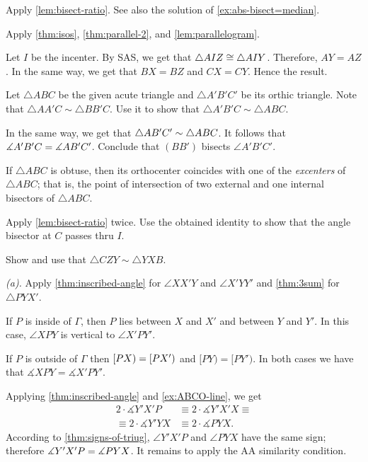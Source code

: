 Apply \ref{lem:bisect-ratio}.
See also the solution of \ref{ex:abs-bisect=median}.

Apply \ref{thm:isos}, \ref{thm:parallel-2}, and \ref{lem:parallelogram}.

Let $I$ be the incenter.
By SAS, we get that $\triangle AIZ\cong\triangle AIY$.
Therefore, $AY=AZ$.
In the same way, we get that $BX=BZ$ and $CX=CY$.
Hence the result.

Let $\triangle ABC$ be the given acute triangle and $\triangle A'B'C'$ 
be its orthic triangle.
Note that $\triangle AA'C\sim\triangle BB'C$.
Use it to show that $\triangle A'B'C\sim \triangle ABC$.

In the same way, we get that $\triangle AB'C'\sim \triangle ABC$.
It follows that $\measuredangle A'B'C=\measuredangle AB'C'$.
Conclude that $(BB')$ bisects $\angle A'B'C'$.

If $\triangle ABC$ is obtuse, then its orthocenter coincides with one of the \emph{excenters} of $\triangle ABC$;
that is, 
the point of intersection of two external and one internal bisectors of $\triangle ABC$.

Apply \ref{lem:bisect-ratio} twice.
Use the obtained identity to show that the angle bisector at $C$ passes thru $I$.

Show and use that $\triangle CZY\sim\triangle YXB$.

\setcounter{eqtn}{0}

 \textit{(a).}
Apply \ref{thm:inscribed-angle} for $\angle XX'Y$ and $\angle X'YY'$
and \ref{thm:3sum} for $\triangle PYX'$.

 If $P$ is inside of $\Gamma$, then $P$ lies between $X$ and $X'$ and between $Y$ and $Y'$.
In this case, $\angle XPY$ is vertical to $\angle X'PY'$.

If $P$ is outside of $\Gamma$ then $[PX)=[PX')$ and $[PY)=[PY')$.
In both cases we have that $\measuredangle XPY=\measuredangle X'PY'$.

Applying \ref{thm:inscribed-angle} and \ref{ex:ABCO-line}, we get
\pagebreak[0]
\begin{align*}
2\cdot \measuredangle Y'X'P
&\equiv
2\cdot \measuredangle Y'X'X\equiv 
\\
\equiv
2\cdot\measuredangle Y'YX
&\equiv
2\cdot\measuredangle PYX.
\end{align*}
According to \ref{thm:signs-of-triug}, $\angle Y'X'P$ and $\angle PYX$ have the same sign;
therefore
$\measuredangle Y'X'P= \measuredangle PYX$.
It remains to apply the AA similarity condition.

